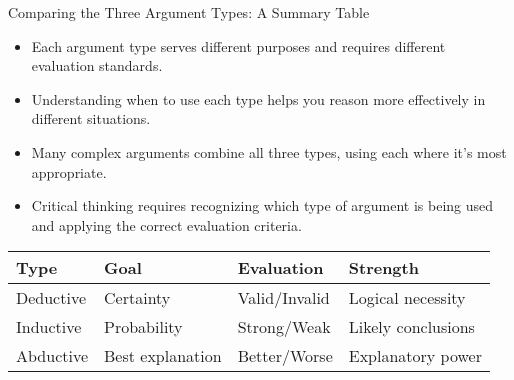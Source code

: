 \documentclass{beamer}
\begin{document}
\begin{frame}{Comparing the Three Argument Types: A Summary Table}
	\begin{itemize}
		\item Each argument type serves different purposes and requires different evaluation standards.
		\item Understanding when to use each type helps you reason more effectively in different situations.
		\item Many complex arguments combine all three types, using each where it's most appropriate.
		\item Critical thinking requires recognizing which type of argument is being used and applying the correct evaluation criteria.
	\end{itemize}
	
	\begin{table}[h]
		\centering
		\small
		\begin{tabular}{|l|l|l|l|}
			\hline
			\textbf{Type} & \textbf{Goal} & \textbf{Evaluation} & \textbf{Strength} \\
			\hline
			Deductive & Certainty & Valid/Invalid & Logical necessity \\
			\hline
			Inductive & Probability & Strong/Weak & Likely conclusions \\
			\hline
			Abductive & Best explanation & Better/Worse & Explanatory power \\
			\hline
		\end{tabular}
	\end{table}
\end{frame}
\end{document}
